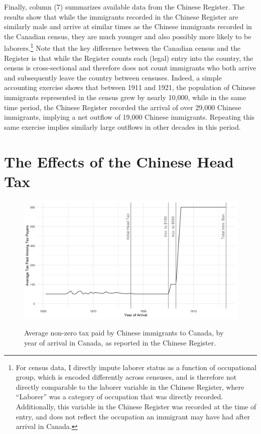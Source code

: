 \documentclass[12pt]{article}
\begin{document}
Finally, column (7) summarizes available data from the Chinese Register. The results show that while the immigrants recorded in the Chinese Register are similarly male and arrive at similar times as the Chinese immigrants recorded in the Canadian census, they are much younger and also possibly more likely to be laborers.\footnote{For census data, I directly impute laborer status as a function of occupational group, which is encoded differently across censuses, and is therefore not directly comparable to the laborer variable in the Chinese Register, where ``Laborer'' was a category of occupation that was directly recorded. Additionally, this variable in the Chinese Register was recorded at the time of entry, and does not reflect the occupation an immigrant may have had after arrival in Canada.}
Note that the key difference between the Canadian census and the Register is that while the Register counts each (legal) entry into the country, the census is cross-sectional and therefore does not count immigrants who both arrive and subsequently leave the country between censuses. Indeed, a simple accounting exercise shows that between 1911 and 1921, the population of Chinese immigrants represented in the census grew by nearly 10,000, while in the same time period, the Chinese Register recorded the arrival of over 29,000 Chinese immigrants, implying a net outflow of 19,000 Chinese immigrants. Repeating this same exercise implies similarly large outflows in other decades in this period. 


\section{The Effects of the Chinese Head Tax}

\begin{figure}
    \centering 
    \caption{Average non-zero tax paid by Chinese immigrants to Canada, by year of arrival in Canada, as reported in the Chinese Register.}
    \includegraphics[width=\textwidth]{../../figs/shortpaper_figs/fig1_taxespaid.png}
    \label{fig:taxpaid}
\end{figure}
\end{document}
